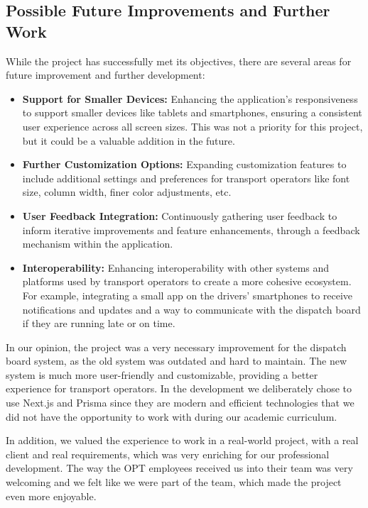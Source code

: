 \documentclass[10pt]{article}
\begin{document}
         \subsection{Possible Future Improvements and Further Work}

         While the project has successfully met its objectives, there are several areas for future improvement and further development:

         \begin{itemize}
             \item \textbf{Support for Smaller Devices:} Enhancing the application's responsiveness to support smaller devices like tablets and smartphones, ensuring a consistent user experience across all screen sizes. This was not a priority for this project, but it could be a valuable addition in the future.
             \item \textbf{Further Customization Options:} Expanding customization features to include additional settings and preferences for transport operators like font size, column width, finer color adjustments, etc.
             \item \textbf{User Feedback Integration:} Continuously gathering user feedback to inform iterative improvements and feature enhancements, through a feedback mechanism within the application.
             \item \textbf{Interoperability:} Enhancing interoperability with other systems and platforms used by transport operators to create a more cohesive ecosystem. For example, integrating a small app on the drivers' smartphones to receive notifications and updates and a way to communicate with the dispatch board if they are running late or on time.
         \end{itemize}

         In our opinion, the project was a very necessary improvement for the dispatch board system, as the old system was outdated and hard to maintain. The new system is much more user-friendly and customizable, providing a better experience for transport operators. In the development we deliberately chose to use Next.js and Prisma since they are modern and efficient technologies that we did not have the opportunity to work with during our academic curriculum. 

         In addition, we valued the experience to work in a real-world project, with a real client and real requirements, which was very enriching for our professional development. The way the OPT employees received us into their team was very welcoming and we felt like we were part of the team, which made the project even more enjoyable.
\end{document}
